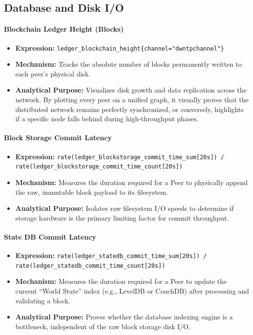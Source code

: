 \subsection{Database and Disk I/O}

\paragraph{Blockchain Ledger Height (Blocks)}
\begin{itemize}
    \item \textbf{Expression:} \verb|ledger_blockchain_height{channel="dwntpchannel"}|
    \item \textbf{Mechanism:} Tracks the absolute number of blocks permanently written to each peer's physical disk.
    \item \textbf{Analytical Purpose:} Visualizes disk growth and data replication across the network. By plotting every peer on a unified graph, it visually proves that the distributed network remains perfectly synchronized, or conversely, highlights if a specific node falls behind during high-throughput phases.
\end{itemize}

\paragraph{Block Storage Commit Latency}
\begin{itemize}
    \item \textbf{Expression:} \verb|rate(ledger_blockstorage_commit_time_sum[20s]) / rate(ledger_blockstorage_commit_time_count[20s])|
    \item \textbf{Mechanism:} Measures the duration required for a Peer to physically append the raw, immutable block payload to its filesystem.
    \item \textbf{Analytical Purpose:} Isolates raw filesystem I/O speeds to determine if storage hardware is the primary limiting factor for commit throughput.
\end{itemize}

\paragraph{State DB Commit Latency}
\begin{itemize}
    \item \textbf{Expression:} \verb|rate(ledger_statedb_commit_time_sum[20s]) / rate(ledger_statedb_commit_time_count[20s])|
    \item \textbf{Mechanism:} Measures the duration required for a Peer to update the current ``World State'' index (e.g., LevelDB or CouchDB) after processing and validating a block.
    \item \textbf{Analytical Purpose:} Proves whether the database indexing engine is a bottleneck, independent of the raw block storage disk I/O.
\end{itemize}

